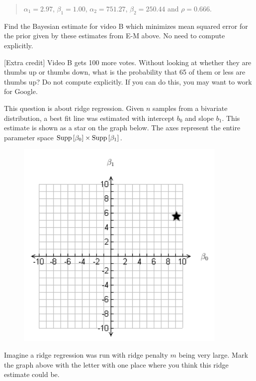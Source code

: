 \documentclass[12pt]{article}
\begin{document}
\begin{quote}
$\alpha_1 = 2.97$, $\beta_1 = 1.00$, $\alpha_2 = 751.27$, $\beta_2 = 250.44$ and $\rho = 0.666$.
\end{quote} 

Find the Bayesian estimate for video B which minimizes mean squared error for the prior given by these estimates from E-M above. No need to compute explicitly. %

 [Extra credit] Video B gets 100 more votes. Without looking at whether they are thumbs up or thumbs down, what is the probability that 65 of them or less are thumbs up? Do not compute explicitly. If you can do this, you may want to work for Google. %


\eenum


\problem This question is about ridge regression. Given $n$ samples from a bivariate distribution, a best fit line was estimated with intercept $b_0$ and slope $b_1$. This estimate is shown as a star on the graph below. The axes represent the entire parameter space $\text{Supp}\left[\beta_0\right] \times \text{Supp}\left[\beta_1\right]$.

\begin{figure}[htp]
\centering
\includegraphics[width=4in]{graph.png}
\end{figure}

\benum

 Imagine a ridge regression was run with ridge penalty $m$ being very large. Mark the graph above with the letter  with one place where you think this ridge estimate could be.  %
\end{document}
